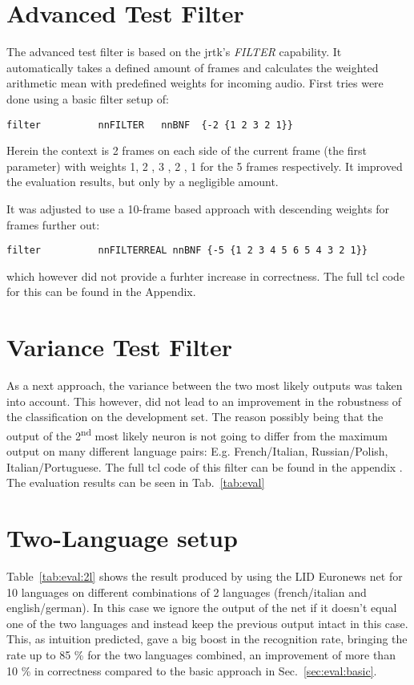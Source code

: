 \section{Advanced Test Filter}
\label{sec:eval:advanced}
The advanced test filter is based on the jrtk's \textit{FILTER} capability. It automatically takes a defined amount of frames and calculates the weighted arithmetic mean with predefined weights for incoming audio. First tries were done using a basic filter setup of:
\begin{verbatim}
filter          nnFILTER   nnBNF  {-2 {1 2 3 2 1}}
\end{verbatim}  Herein the context is 2 frames on each side of the current frame (the first parameter) with weights 1, 2 , 3 , 2 , 1 for the 5 frames respectively.  It improved the evaluation results, but only by a negligible amount.

It was adjusted to use a 10-frame based approach with descending weights for frames further out:
\begin{verbatim}
filter          nnFILTERREAL nnBNF {-5 {1 2 3 4 5 6 5 4 3 2 1}}
\end{verbatim}
which however did not provide a furhter increase in correctness. The full tcl code for this can be found in the Appendix.


\section{Variance Test Filter}
\label{sec:eval:variance}
As a next approach, the variance between the two most likely outputs was taken into account. This however, did not lead to an improvement in the robustness of the classification on the development set. The reason possibly being that the output of the 2\textsuperscript{nd} most likely neuron is not going to differ from the maximum output on many different language pairs: E.g. French/Italian, Russian/Polish, Italian/Portuguese. The full tcl code of this filter can be found in the appendix . The evaluation results can be seen in Tab.~\ref{tab:eval}

\section{Two-Language setup}
\label{sec:eval:2L}
Table~\ref{tab:eval:2l} shows the result produced by using the LID Euronews net for 10 languages on different combinations of 2 languages (french/italian and english/german). In this case we ignore the output of the net if it doesn't equal one of the two languages and instead keep the previous output intact in this case. This, as intuition predicted, gave a big boost in the recognition rate, bringing the rate up to 85 \% for the two languages combined, an improvement of more than 10 \% in correctness compared to the basic approach in Sec.~\ref{sec:eval:basic}.

	